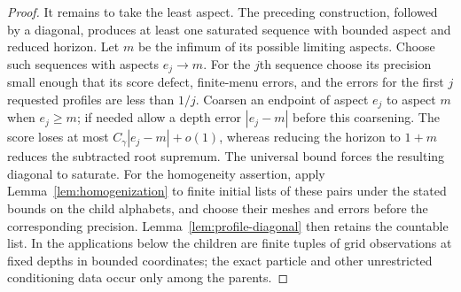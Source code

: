 \begin{proof}
It remains to take the least aspect.  The preceding construction,
followed by a diagonal, produces at least one saturated sequence with
bounded aspect and reduced horizon.  Let $m$ be the infimum of its
possible limiting aspects.  Choose such sequences with aspects
$e_j\to m$.  For the $j$th sequence choose its precision small enough
that its score defect, finite-menu errors, and the errors for the first
$j$ requested profiles are less than $1/j$.  Coarsen an endpoint of
aspect $e_j$ to aspect $m$ when $e_j\ge m$; if needed allow a depth error
$|e_j-m|$ before this coarsening.  The score loses at most
$C_\gamma|e_j-m|+o(1)$, whereas reducing the horizon to $1+m$ reduces
the subtracted root supremum.  The universal bound forces the resulting
diagonal to saturate.  For the homogeneity assertion, apply Lemma~\ref{lem:homogenization} to
finite initial lists of these pairs under the stated bounds on the child
alphabets, and choose their meshes and errors before the corresponding
precision.  Lemma~\ref{lem:profile-diagonal} then retains the countable
list.  In the applications below the children are finite tuples of grid
observations at fixed depths in bounded coordinates; the exact particle
and other unrestricted conditioning data occur only among the parents.
\end{proof}


